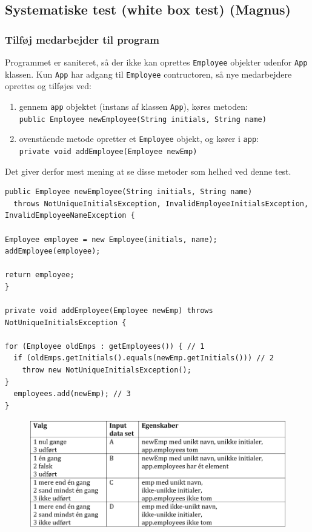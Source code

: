 \subsection{Systematiske test (white box test) (Magnus)}
\label{whitebox}

\subsubsection{Tilføj medarbejder til program}

Programmet er saniteret, så der ikke kan oprettes \texttt{Employee} objekter udenfor \texttt{App} klassen. Kun \texttt{App} har adgang til \texttt{Employee} contructoren, så nye medarbejdere oprettes og tilføjes ved:
\begin{enumerate}
\item gennem \texttt{app} objektet (instans af klassen \texttt{App}), køres metoden:  \\
    \texttt{public Employee newEmployee(String initials, String name)}
\item ovenstående metode  opretter et \texttt{Employee} objekt, og kører i \texttt{app}: \\
\texttt{private void addEmployee(Employee newEmp)}
\end{enumerate}

Det giver derfor mest mening at se disse metoder som helhed ved denne test.

\begin{lstlisting}
public Employee newEmployee(String initials, String name)
  throws NotUniqueInitialsException, InvalidEmployeeInitialsException, InvalidEmployeeNameException {

Employee employee = new Employee(initials, name);
addEmployee(employee);

return employee;
}

private void addEmployee(Employee newEmp) throws NotUniqueInitialsException {

for (Employee oldEmps : getEmployees()) { // 1
  if (oldEmps.getInitials().equals(newEmp.getInitials())) // 2
    throw new NotUniqueInitialsException();
}
  employees.add(newEmp); // 3
}
\end{lstlisting}

\begin{figure}[H]
    \centering
    \includegraphics[width = \textwidth]{Figurer/whitebox1a.PNG}
    \label{fig:whitebox1a}
\end{figure}

